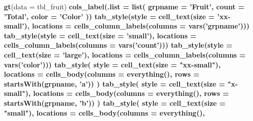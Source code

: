 \documentclass[]{article}
\newenvironment{Shaded}{\begin{snugshade}}{\end{snugshade}}
\newcommand{\DataTypeTok}[1]{\textcolor[rgb]{0.13,0.29,0.53}{#1}}
\newcommand{\KeywordTok}[1]{\textcolor[rgb]{0.13,0.29,0.53}{\textbf{#1}}}
\newcommand{\NormalTok}[1]{#1}
\newcommand{\OperatorTok}[1]{\textcolor[rgb]{0.81,0.36,0.00}{\textbf{#1}}}
\newcommand{\StringTok}[1]{\textcolor[rgb]{0.31,0.60,0.02}{#1}}
\begin{document}
\begin{Shaded}
\begin{Highlighting}[]
\KeywordTok{gt}\NormalTok{(}\DataTypeTok{data =}\NormalTok{ tbl_fruit) }\OperatorTok{%>%}
\StringTok{  }\KeywordTok{cols_label}\NormalTok{(}\DataTypeTok{.list =} \KeywordTok{list}\NormalTok{(}
    \DataTypeTok{grpname =} \StringTok{'Fruit'}\NormalTok{,}
    \DataTypeTok{count =} \StringTok{'Total'}\NormalTok{,}
    \DataTypeTok{color =} \StringTok{'Color'}
\NormalTok{  )) }\OperatorTok{%>%}
\StringTok{  }
\StringTok{  }\KeywordTok{tab_style}\NormalTok{(}\DataTypeTok{style =} \KeywordTok{cell_text}\NormalTok{(}\DataTypeTok{size =} \StringTok{'xx-small'}\NormalTok{),}
            \DataTypeTok{locations =} \KeywordTok{cells_column_labels}\NormalTok{(}\DataTypeTok{columns =} \KeywordTok{vars}\NormalTok{(}\StringTok{'grpname'}\NormalTok{))) }\OperatorTok{%>%}
\StringTok{  }
\StringTok{  }\KeywordTok{tab_style}\NormalTok{(}\DataTypeTok{style =} \KeywordTok{cell_text}\NormalTok{(}\DataTypeTok{size =} \StringTok{'small'}\NormalTok{),}
            \DataTypeTok{locations =} \KeywordTok{cells_column_labels}\NormalTok{(}\DataTypeTok{columns =} \KeywordTok{vars}\NormalTok{(}\StringTok{'count'}\NormalTok{))) }\OperatorTok{%>%}
\StringTok{  }
\StringTok{  }\KeywordTok{tab_style}\NormalTok{(}\DataTypeTok{style =} \KeywordTok{cell_text}\NormalTok{(}\DataTypeTok{size =} \StringTok{'large'}\NormalTok{),}
            \DataTypeTok{locations =} \KeywordTok{cells_column_labels}\NormalTok{(}\DataTypeTok{columns =} \KeywordTok{vars}\NormalTok{(}\StringTok{'color'}\NormalTok{))) }\OperatorTok{%>%}
\StringTok{  }
\StringTok{  }\KeywordTok{tab_style}\NormalTok{(}
    \DataTypeTok{style =} \KeywordTok{cell_text}\NormalTok{(}\DataTypeTok{size =} \StringTok{"xx-small"}\NormalTok{),}
    \DataTypeTok{locations =} \KeywordTok{cells_body}\NormalTok{(}\DataTypeTok{columns =} \KeywordTok{everything}\NormalTok{(),}
                           \DataTypeTok{rows =} \KeywordTok{startsWith}\NormalTok{(grpname, }\StringTok{'a'}\NormalTok{))}
\NormalTok{  ) }\OperatorTok{%>%}
\StringTok{  }\KeywordTok{tab_style}\NormalTok{(}
    \DataTypeTok{style =} \KeywordTok{cell_text}\NormalTok{(}\DataTypeTok{size =} \StringTok{"x-small"}\NormalTok{),}
    \DataTypeTok{locations =} \KeywordTok{cells_body}\NormalTok{(}\DataTypeTok{columns =} \KeywordTok{everything}\NormalTok{(),}
                           \DataTypeTok{rows =} \KeywordTok{startsWith}\NormalTok{(grpname, }\StringTok{'b'}\NormalTok{))}
\NormalTok{  ) }\OperatorTok{%>%}
\StringTok{  }\KeywordTok{tab_style}\NormalTok{(}
    \DataTypeTok{style =} \KeywordTok{cell_text}\NormalTok{(}\DataTypeTok{size =} \StringTok{"small"}\NormalTok{),}
    \DataTypeTok{locations =} \KeywordTok{cells_body}\NormalTok{(}\DataTypeTok{columns =} \KeywordTok{everything}\NormalTok{(),}
}}}}}}}
\end{Highlighting}
\end{Shaded}
\end{document}

